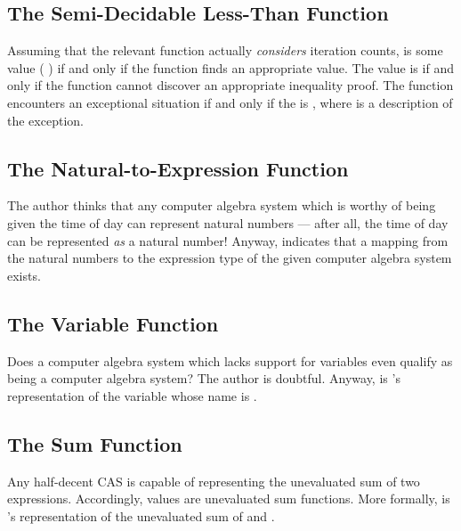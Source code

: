 \documentclass{report}
\begin{document}
\subsection{The Semi-Decidable Less-Than Function}
Assuming that the relevant function actually \emph{considers} iteration counts,      is some value  \AgdaSymbol( \AgdaSymbol) if and only if the  function finds an appropriate value.  The  value is   if and only if the function cannot discover an appropriate inequality proof.  The function encounters an exceptional situation if and only if the  is  , where  is a description of the exception.

\subsection{The Natural-to-Expression Function}
The author thinks that any computer algebra system which is worthy of being given the time of day can represent natural numbers --- after all, the time of day can be represented \emph{as} a natural number!  Anyway,  indicates that a mapping from the natural numbers to the expression type of the given computer algebra system exists.

\subsection{The Variable Function}
Does a computer algebra system which lacks support for variables even qualify as being a computer algebra system?  The author is doubtful.  Anyway,    is 's representation of the variable whose name is .

\subsection{The Sum Function}
Any half-decent CAS is capable of representing the unevaluated sum of two expressions.  Accordingly, \AgdaField{\AgdaUnderscore{}+\AgdaUnderscore{}} values are unevaluated sum functions.  More formally,     is 's representation of the unevaluated sum of  and .
\end{document}
